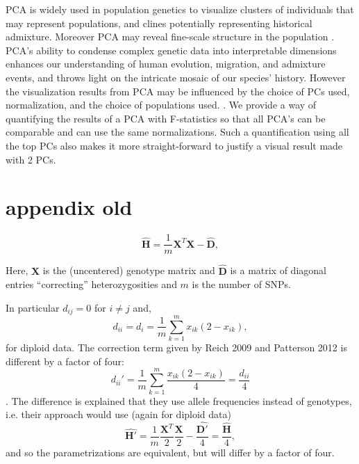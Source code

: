 \documentclass[12pt, letterpaper]{article}
\newcommand{\MX}{\mathbf{X}}
\begin{document}
PCA is widely used in population genetics to visualize clusters of individuals that may represent populations, and clines potentially representing historical admixture. Moreover PCA may reveal fine-scale structure in the population \cite{waldman_genome-wide_2022}. PCA's ability to condense complex genetic data into interpretable dimensions enhances our understanding of human evolution, migration, and admixture events, and throws light on the intricate mosaic of our species' history. However the visualization results from PCA may be influenced by the choice of PCs used, normalization, and the choice of populations used. \cite{elhaik_principal_2022}. We provide a way of quantifying the results of a PCA with F-statistics so that all PCA's can be comparable and can use the same normalizations. Such a quantification using all the top PCs also makes it more straight-forward to justify a visual result made with 2 PCs.










\section{appendix old}
\begin{equation}
    \hat{\mathbf{H}} = \frac{1}{m}\mathbf{X}^T\mathbf{X} - \hat{\mathbf{D}},
\end{equation}

Here, $\MX$ is the (uncentered) genotype matrix and $\hat{\mathbf{D}}$ is a matrix of diagonal entries ``correcting'' heterozygosities and $m$ is the number of SNPs.

In particular $d_{ij} = 0 $ for $i \neq j$ and, 
\begin{equation}
    d_{ii} = d_i = \frac{1}{m}\sum_{k=1}^m x_{ik}(2-x_{ik}),
\end{equation}
for diploid data. The correction term given by Reich 2009 and Patterson 2012 is different by a factor of four:
\begin{equation*}
    d_{ii}' = \frac{1}{m}\sum_{k=1}^m \frac{x_{ik}(2-x_{ik})}{4} = \frac{d_{ii}}{4}
\end{equation*}.
The difference is explained that they use allele frequencies instead of genotypes, i.e. their approach would use (again for diploid data)
\begin{equation*}
    \hat{\mathbf{H}'} = \frac{1}{m}\frac{\mathbf{X}^T}{2}\frac{\mathbf{X}}{2} - \frac{\hat{\mathbf{D'}}}{4} = \frac{\hat{\mathbf{H}}}{4},
\end{equation*}
and so the parametrizations are equivalent, but will differ by a factor of four.
\end{document}
